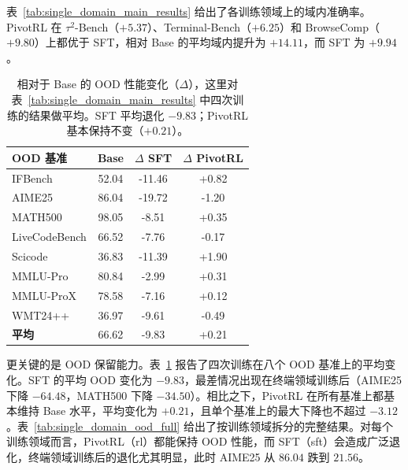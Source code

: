 表~\ref{tab:single_domain_main_results} 给出了各训练领域上的域内准确率。PivotRL 在 $\tau^2$-Bench（$+5.37$）、Terminal-Bench（$+6.25$）和 BrowseComp（$+9.80$）上都优于 SFT，相对 Base 的平均域内提升为 $+14.11$，而 SFT 为 $+9.94$。
\begin{table}[t]
\centering
\small
\begin{tabular}{l c cc}
\toprule
\textbf{OOD 基准} & \textbf{Base} & \textbf{$\Delta$ SFT} & \textbf{$\Delta$ PivotRL} \\
\midrule
IFBench        & 52.04 & -11.46 & +0.82 \\
AIME25         & 86.04 & -19.72 & -1.20 \\
MATH500        & 98.05 & -8.51  & +0.35 \\
LiveCodeBench  & 66.52 & -7.76  & -0.17 \\
Scicode        & 36.83 & -11.39  & +1.90 \\
MMLU-Pro       & 80.84 & -2.99  & +0.31 \\
MMLU-ProX      & 78.58 & -7.16  & +0.12 \\
WMT24++        & 36.97 & -9.61  & -0.49 \\
\midrule
\textbf{平均} & 66.62 & -9.83 & +0.21 \\
\bottomrule
\end{tabular}
\caption{
相对于 Base 的 OOD 性能变化（$\Delta$），这里对表~\ref{tab:single_domain_main_results} 中四次训练的结果做平均。SFT 平均退化 $-9.83$；PivotRL 基本保持不变（$+0.21$）。
}
\label{tab:single_domain_ood_avg}
\end{table}
更关键的是 OOD 保留能力。表~\ref{tab:single_domain_ood_avg} 报告了四次训练在八个 OOD 基准上的平均变化。SFT 的平均 OOD 变化为 $-9.83$，最差情况出现在终端领域训练后（AIME25 下降 $-64.48$，MATH500 下降 $-34.50$）。相比之下，PivotRL 在所有基准上都基本维持 Base 水平，平均变化为 $+0.21$，且单个基准上的最大下降也不超过 $-3.12$。表~\ref{tab:single_domain_ood_full} 给出了按训练领域拆分的完整结果。对每个训练领域而言，PivotRL（rl）都能保持 OOD 性能，而 SFT（sft）会造成广泛退化，终端领域训练后的退化尤其明显，此时 AIME25 从 $86.04$ 跌到 $21.56$。

